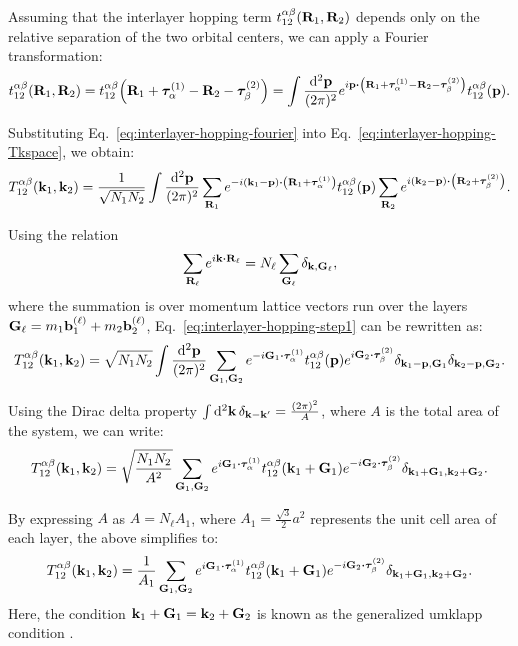 Assuming that the interlayer hopping term \( t_{12}^{\alpha\beta}({\vb{R}}_1,{\vb{R}}_2) \) depends only on the relative separation of the two orbital centers, we can apply a Fourier transformation:
\begin{equation} \label{eq:interlayer-hopping-fourier}
t_{12}^{\alpha\beta}(\R_1,\R_2) = t_{12}^{\alpha\beta}\qty(\R_1+\vtau_{\alpha}^{(1)}-\R_2-\vtau_{\beta}^{(2)}) =
\int \frac{\dd[2]{\p}}{(2\pi)^2} e^{i \p \vdot \qty(\R_1+\vtau_{\alpha}^{(1)}-\R_2-\vtau_{\beta}^{(2)})} t_{12}^{\alpha\beta}(\p).
\end{equation}

Substituting Eq.~\eqref{eq:interlayer-hopping-fourier} into Eq.~\eqref{eq:interlayer-hopping-Tkspace}, we obtain:
\begin{equation} \label{eq:interlayer-hopping-step1}
T_{12}^{\alpha\beta}(\k_1,\k_2) =
\frac{1}{\sqrt{N_1 N_2}} \int \frac{\dd[2]{\p}}{(2\pi)^2} \sum_{\R_1} e^{-i(\k_1-\p)\vdot\qty(\R_1+\vtau_{\alpha}^{(1)})}
t_{12}^{\alpha\beta}(\p) \sum_{\R_2} e^{i(\k_2-\p)\vdot\qty(\R_2+\vtau_{\beta}^{(2)})}.
\end{equation}

Using the relation
\[
\sum_{\R_\ell} e^{i \k \vdot \R_\ell} = N_\ell \sum_{\G_\ell} \delta_{\k,\G_\ell},
\]
where the summation is over momentum lattice vectors run over the layers \({\vb{G}}_\ell = m_1 {\vb{b}}_1^{(\ell)} + m_2 {\vb{b}}_2^{(\ell)}\), Eq.~\eqref{eq:interlayer-hopping-step1} can be rewritten as:
\begin{equation} \label{eq:interlayer-hopping-step2}
T_{12}^{\alpha\beta}(\k_1,\k_2) =
\sqrt{N_1 N_2} \int \frac{\dd[2]{\p}}{(2\pi)^2} \sum_{\G_1, \G_2}
e^{-i \G_1 \vdot \vtau_\alpha^{(1)}} t_{12}^{\alpha\beta}(\p) e^{i \G_2\vdot\vtau_\beta^{(2)}}
\delta_{\k_1-\p, \G_1} \delta_{\k_2-\p, \G_2}.
\end{equation}

Using the Dirac delta property \(\int \dd[2]{{\vb{k}}} \delta_{{\vb{k}}-{\vb{k}}'} = \frac{(2\pi)^2}{A}\), where \(A\) is the total area of the system, we can write:
\begin{equation} \label{eq:interlayer-hopping-step3}
T_{12}^{\alpha\beta}(\k_1,\k_2) =
\sqrt{\frac{N_1 N_2}{A^2}} \sum_{\G_1, \G_2}
e^{i \G_1 \vdot \vtau_\alpha^{(1)}} t_{12}^{\alpha\beta}(\k_1+\G_1) e^{-i \G_2\vdot\vtau_\beta^{(2)}}
\delta_{\k_1+\G_1, \k_2+\G_2}.
\end{equation}

By expressing \(A\) as \(A = N_\ell A_1\), where \(A_1 = \frac{\sqrt{3}}{2} a^2\) represents the unit cell area of each layer, the above simplifies to:
\begin{equation} \label{eq:interlayer-hopping-simplified}
T_{12}^{\alpha\beta}(\k_1,\k_2) = \frac{1}{A_1} \sum_{\G_1, \G_2}
e^{i \G_1 \vdot \vtau_\alpha^{(1)}} t_{12}^{\alpha\beta}(\k_1+\G_1) e^{-i \G_2\vdot\vtau_\beta^{(2)}}
\delta_{\k_1+\G_1, \k_2+\G_2}.
\end{equation}
Here, the condition \({\vb{k}}_1 + {\vb{G}}_1 = {\vb{k}}_2 + {\vb{G}}_2\) is known as the generalized umklapp condition \cite{handbook2019}.

